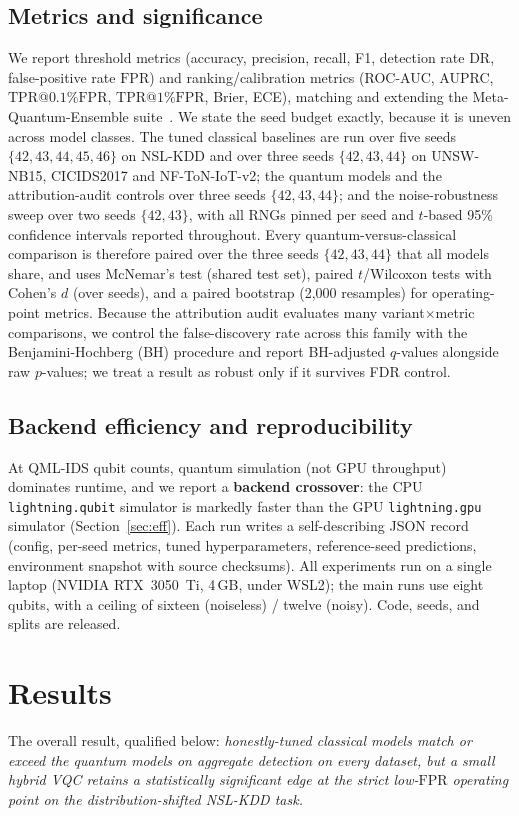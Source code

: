 \documentclass[preprint,11pt]{elsarticle}
\newcommand{\tpr}{\mathrm{TPR}}
\newcommand{\fpr}{\mathrm{FPR}}
\begin{document}
\subsection{Metrics and significance}\label{sec:metrics}
We report threshold metrics (accuracy, precision, recall, F1, detection rate DR, false-positive rate
$\fpr$) and ranking/calibration metrics (ROC-AUC, AUPRC, $\tpr$@$0.1\%\fpr$, $\tpr$@$1\%\fpr$, Brier,
ECE), matching and extending the Meta-Quantum-Ensemble suite~\cite{bhatnagar2026mqe}. We state the
seed budget exactly, because it is uneven across model classes. The tuned classical baselines are run
over five seeds $\{42,43,44,45,46\}$ on NSL-KDD and over three seeds $\{42,43,44\}$ on UNSW-NB15,
CICIDS2017 and NF-ToN-IoT-v2; the quantum models and the attribution-audit controls over three seeds
$\{42,43,44\}$; and the noise-robustness sweep over two seeds $\{42,43\}$, with all RNGs pinned per
seed and $t$-based 95\% confidence intervals reported throughout. Every quantum-versus-classical
comparison is therefore paired over the three seeds $\{42,43,44\}$ that all models share, and uses
McNemar's
test (shared test set), paired $t$/Wilcoxon tests with Cohen's $d$ (over seeds), and a paired bootstrap
(2{,}000 resamples) for operating-point metrics. Because the attribution audit evaluates many
variant$\times$metric comparisons, we control the false-discovery rate across this family with the
Benjamini-Hochberg (BH) procedure and report BH-adjusted $q$-values alongside raw $p$-values; we treat
a result as robust only if it survives FDR control.

\subsection{Backend efficiency and reproducibility}
At QML-IDS qubit counts, quantum simulation (not GPU throughput) dominates runtime, and we report a
\textbf{backend crossover}: the CPU \texttt{lightning.qubit} simulator is markedly faster than the GPU
\texttt{lightning.gpu} simulator (Section~\ref{sec:eff}). Each run writes a self-describing JSON record
(config, per-seed metrics, tuned hyperparameters, reference-seed predictions, environment snapshot with
source checksums). All experiments run on a single laptop (NVIDIA RTX~3050~Ti, 4\,GB, under WSL2); the
main runs use eight qubits, with a ceiling of sixteen (noiseless) / twelve (noisy). Code, seeds, and
splits are released.

\section{Results}
The overall result, qualified below: \emph{honestly-tuned classical models match or exceed the quantum
models on aggregate detection on every dataset, but a small hybrid VQC retains a statistically
significant edge at the strict low-$\fpr$ operating point on the distribution-shifted NSL-KDD task.}
\end{document}
